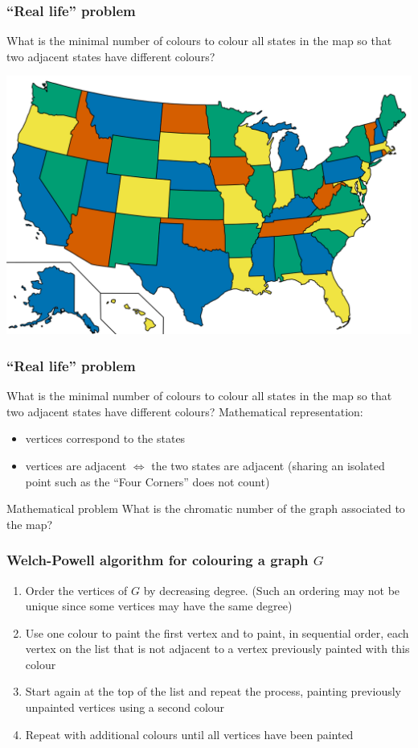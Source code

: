 \documentclass[aspectratio=169]{beamer}\usepackage[]{graphicx}\usepackage[]{xcolor}
\begin{document}
\begin{frame}\frametitle{``Real life'' problem}
What is the minimal number of colours to colour all states in the map so that two adjacent states have different colours?
\begin{center}
\includegraphics[width=.85\textwidth]{FIGS_slides/USA-4-colours}
\end{center}\end{frame}

\begin{frame}\frametitle{``Real life'' problem}
	What is the minimal number of colours to colour all states in the map so that two adjacent states have different colours?
	\vfill
Mathematical representation:
\begin{itemize}
\item vertices correspond to the states
\item vertices are adjacent $\iff$ the two states are adjacent (sharing an isolated point such as the ``Four Corners'' does not count)
\end{itemize}
\vfill
\begin{block}{Mathematical problem}
What is the chromatic number of the graph associated to the map?
\end{block}
\end{frame}

\begin{frame}\frametitle{Welch-Powell algorithm for colouring a graph $G$}
	\begin{enumerate}
	\item Order the vertices of $G$ by decreasing degree. (Such an ordering may not be unique since some vertices may have the same degree)
	\vfill
	\item Use one colour to paint the first vertex and to paint, in sequential order, each vertex on the list that is not adjacent to a vertex previously painted with this colour
	\vfill
	\item Start again at the top of the list and repeat the process, painting previously unpainted vertices using a second colour
	\vfill
	\item Repeat with additional colours until all vertices have been painted
\end{enumerate}\end{frame}
	
\end{document}
